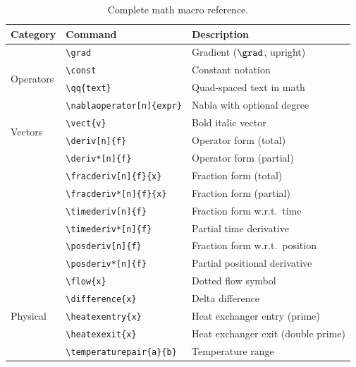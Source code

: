 \begin{table}[htbp]
  \centering
  \caption{Complete math macro reference.}
  \label{tab:math-macro-ref}
  \begin{tabular}{@{}llp{}@{}}
    \toprule
    Category & Command & Description \\
    \midrule
    \multirow{4}{*}{Operators}
      & \texttt{\textbackslash grad}         & Gradient ($\grad$, upright) \\
      & \texttt{\textbackslash const}        & Constant notation \\
      & \texttt{\textbackslash qq\{text\}}   & Quad-spaced text in math \\
      & \texttt{\textbackslash nablaoperator[n]\{expr\}} & Nabla with optional degree \\
    \midrule
    \multirow{2}{*}{Vectors}
      & \texttt{\textbackslash vect\{v\}}    & Bold italic vector \\
    \midrule
    \multirow{10}{*}{Derivatives}
      & \texttt{\textbackslash deriv[n]\{f\}}         & Operator form (total) \\
      & \texttt{\textbackslash deriv*[n]\{f\}}        & Operator form (partial) \\
      & \texttt{\textbackslash fracderiv[n]\{f\}\{x\}}   & Fraction form (total) \\
      & \texttt{\textbackslash fracderiv*[n]\{f\}\{x\}}  & Fraction form (partial) \\
      & \texttt{\textbackslash timederiv[n]\{f\}}      & Fraction form w.r.t.\ time \\
      & \texttt{\textbackslash timederiv*[n]\{f\}}     & Partial time derivative \\
      & \texttt{\textbackslash posderiv[n]\{f\}}       & Fraction form w.r.t.\ position \\
      & \texttt{\textbackslash posderiv*[n]\{f\}}      & Partial positional derivative \\
    \midrule
    \multirow{5}{*}{Physical}
      & \texttt{\textbackslash flow\{x\}}             & Dotted flow symbol \\
      & \texttt{\textbackslash difference\{x\}}        & Delta difference \\
      & \texttt{\textbackslash heatexentry\{x\}}       & Heat exchanger entry (prime) \\
      & \texttt{\textbackslash heatexexit\{x\}}        & Heat exchanger exit (double prime) \\
      & \texttt{\textbackslash temperaturepair\{a\}\{b\}} & Temperature range \\

\end{tabular}
\end{table}
